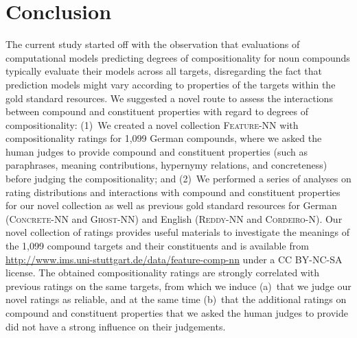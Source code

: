 \documentclass[output=paper,colorlinks,citecolor=brown]{langscibook}
\begin{document}
\section{Conclusion}

The current study started off with the observation that evaluations of computational models predicting degrees of  compositionality for noun compounds typically evaluate their models across all targets, disregarding the fact that prediction models might vary according to properties of the targets within the gold standard resources. We suggested a novel route to assess the interactions between compound and constituent properties with regard to degrees of compositionality: (1)~We created a novel collection \textsc{Feature-NN} with compositionality ratings for 1,099 German compounds, where we asked the human judges to provide compound and constituent properties (such as paraphrases, meaning contributions, hypernymy relations, and concreteness) before judging the compositionality; and (2)~We performed a series of analyses on rating distributions and interactions with compound and constituent properties for our novel collection as well as previous gold standard resources for German (\textsc{Concrete-NN} and \textsc{Ghost-NN}) and English (\textsc{Reddy-NN} and \textsc{Cordeiro-N}). Our novel collection of ratings provides useful materials to investigate the meanings of the 1,099 compound targets and their constituents and is available from \url{http://www.ims.uni-stuttgart.de/data/feature-comp-nn} under a CC BY-NC-SA license. The obtained compositionality ratings are strongly correlated with previous ratings on the same targets, from which we induce (a)~that we judge our novel ratings as reliable, and at the same time (b)~that the additional ratings on compound and constituent properties that we asked the human judges to provide did not have a strong influence on their judgements. 
\end{document}
